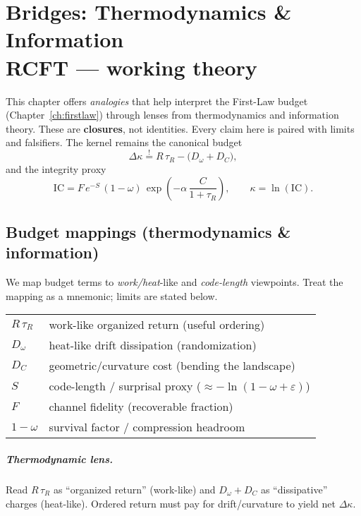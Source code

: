 \chapter{Bridges: Thermodynamics \& Information \\ \large RCFT — working theory}
\label{ch:bridges}

\begin{callout}
This chapter offers \emph{analogies} that help interpret the First-Law budget (Chapter~\ref{ch:firstlaw}) through lenses from thermodynamics and information theory. These are \textbf{closures}, not identities. Every claim here is paired with limits and falsifiers. The kernel remains the canonical budget
\[
\Delta\kappa \stackrel{!}{=} R\,\tau_{R} - \bigl(D_{\omega}+D_{C}\bigr),
\]
and the integrity proxy
\[
\mathrm{IC} = F\,e^{-S}\,(1-\omega)\,\exp\!\left(-\alpha\,\frac{C}{1+\tau_{R}}\right),
\qquad \kappa=\ln(\mathrm{IC}).
\]
\end{callout}

\section{Budget mappings (thermodynamics \& information)}
We map budget terms to \emph{work/heat}-like and \emph{code-length} viewpoints. Treat the mapping as a mnemonic; limits are stated below.

\begin{eqbox}
\small
\begin{tabularx}{\linewidth}{@{}>{\bfseries}l X@{}}
$R\,\tau_{R}$ & work-like organized return (useful ordering) \\
$D_{\omega}$  & heat-like drift dissipation (randomization) \\
$D_{C}$       & geometric/curvature cost (bending the landscape) \\
$S$           & code-length / surprisal proxy ($\approx -\ln(1-\omega+\varepsilon)$) \\
$F$           & channel fidelity (recoverable fraction) \\
$1-\omega$    & survival factor / compression headroom \\
\end{tabularx}
\end{eqbox}

\paragraph{Thermodynamic lens.}
Read $R\,\tau_{R}$ as “organized return” (work-like) and $D_{\omega}+D_{C}$ as “dissipative” charges (heat-like). Ordered return must pay for drift/curvature to yield net $\Delta\kappa$.

